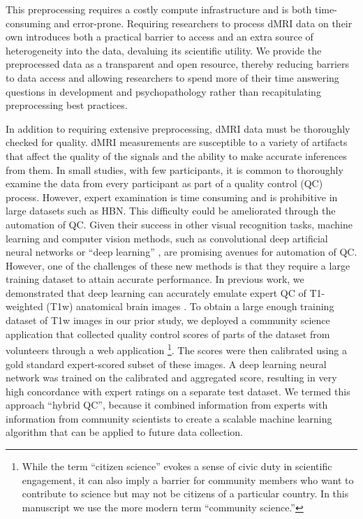 \documentclass[9pt,lineno]{elife}
\begin{document}
This preprocessing requires a costly compute infrastructure and is both time-consuming and error-prone. Requiring researchers to process dMRI data on their own introduces both a practical barrier to access and an extra source of heterogeneity into the data, devaluing its scientific utility. We provide the preprocessed data as a transparent and open resource, thereby reducing barriers to data access and allowing researchers to spend more of their time answering questions in development and psychopathology rather than recapitulating preprocessing best practices.

In addition to requiring extensive preprocessing, dMRI data must be thoroughly checked for quality. dMRI measurements are susceptible to a variety of artifacts that affect
the quality of the signals and the ability to make accurate inferences from
them. In small studies, with few participants, it is common to thoroughly
examine the data from every participant as part of a quality control (QC)
process. However, expert examination is time consuming and is prohibitive in large
datasets such as HBN. This difficulty could be ameliorated through the
automation of QC. Given their success in other visual recognition tasks, machine learning and computer vision methods, such as convolutional deep
artificial neural networks or ``deep learning'' \citep{lecun2015deep}, are
promising avenues for automation of QC. However, one of the challenges of these new
methods is that they require a large training dataset to attain accurate
performance. In previous work, we demonstrated that deep learning can accurately
emulate expert QC of T1-weighted (T1w) anatomical brain images
\citep{keshavan2019-er}. To obtain a large enough training dataset of T1w images
in our prior study, we deployed a community science application that collected quality
control scores of parts of the dataset from volunteers through a web application
\footnote{%
    While the term ``citizen science'' evokes a sense of civic duty in
    scientific engagement, it can also imply a barrier for community members who
    want to contribute to science but may not be citizens of a particular
    country. In this manuscript we use the more modern term ``community
    science.''
}.
The scores were then calibrated using a gold standard expert-scored subset of
these images. A deep learning neural network was trained on the calibrated and
aggregated score, resulting in very high concordance with expert ratings on a
separate test dataset. We termed this approach ``hybrid QC'', because it combined
information from experts with information from community scientists to create a
scalable machine learning algorithm that can be applied to future data
collection.
\end{document}
